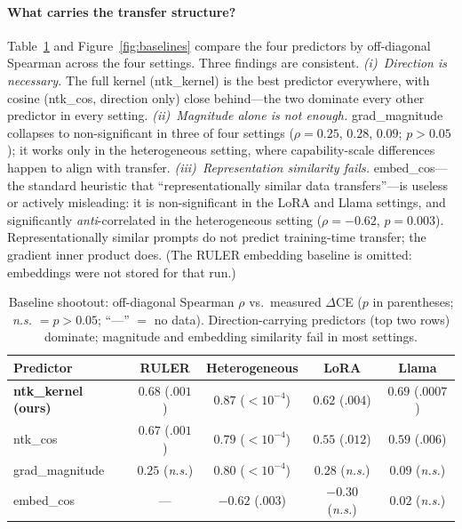 \documentclass{article} %
\begin{document}
\paragraph{What carries the transfer structure?}
Table~\ref{tab:baselines} and Figure~\ref{fig:baselines} compare the four predictors by
off-diagonal Spearman across the four settings. Three findings are consistent. \emph{(i)~Direction
is necessary.} The full kernel (ntk\_kernel) is the best predictor everywhere, with cosine
(ntk\_cos, direction only) close behind---the two dominate every other predictor in every
setting. \emph{(ii)~Magnitude alone is not enough.} grad\_magnitude collapses to non-significant
in three of four settings ($\rho=0.25$, $0.28$, $0.09$; $p>0.05$); it works only in the
heterogeneous setting, where capability-scale differences happen to align with transfer.
\emph{(iii)~Representation similarity fails.} embed\_cos---the standard heuristic that
``representationally similar data transfers''---is useless or actively misleading: it is
non-significant in the LoRA and Llama settings, and significantly \emph{anti}-correlated in the
heterogeneous setting ($\rho=-0.62$, $p=0.003$). Representationally similar prompts do not predict
training-time transfer; the gradient inner product does. (The RULER embedding baseline is omitted:
embeddings were not stored for that run.)

\begin{table}[t]
\centering
\small
\caption{Baseline shootout: off-diagonal Spearman $\rho$ vs.\ measured $\Delta$CE
($p$ in parentheses; \textit{n.s.} $=p>0.05$; ``---'' $=$ no data). Direction-carrying predictors
(top two rows) dominate; magnitude and embedding similarity fail in most settings.}
\label{tab:baselines}
\begin{tabular}{@{}lcccc@{}}
\toprule
Predictor & RULER & Heterogeneous & LoRA & Llama \\
\midrule
\textbf{ntk\_kernel (ours)} & $\mathbf{0.68}$ ($.001$) & $\mathbf{0.87}$ ($<\!10^{-4}$) & $\mathbf{0.62}$ ($.004$) & $\mathbf{0.69}$ ($.0007$) \\
ntk\_cos                    & $0.67$ ($.001$) & $0.79$ ($<\!10^{-4}$) & $0.55$ ($.012$) & $0.59$ ($.006$) \\
grad\_magnitude             & $0.25$ (\textit{n.s.}) & $0.80$ ($<\!10^{-4}$) & $0.28$ (\textit{n.s.}) & $0.09$ (\textit{n.s.}) \\
embed\_cos                  & --- & $-0.62$ ($.003$) & $-0.30$ (\textit{n.s.}) & $0.02$ (\textit{n.s.}) \\
\bottomrule
\end{tabular}
\end{table}
\end{document}
